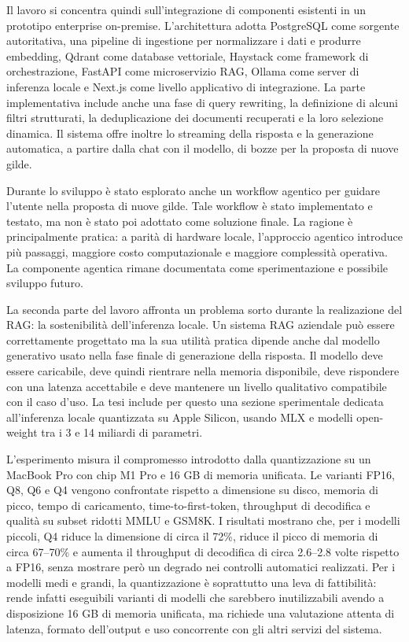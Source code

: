 Il lavoro si concentra quindi sull'integrazione di componenti esistenti in un prototipo enterprise on-premise. 
L'architettura adotta PostgreSQL come sorgente autoritativa, una pipeline di ingestione per normalizzare i dati 
e produrre embedding, Qdrant come database vettoriale, Haystack come framework di orchestrazione, FastAPI come 
microservizio RAG, Ollama come server di inferenza locale e Next.js come livello applicativo di integrazione. 
La parte implementativa include anche una fase di query rewriting, la definizione di alcuni filtri strutturati, 
la deduplicazione dei documenti recuperati e la loro selezione dinamica. Il sistema offre inoltre lo streaming 
della risposta e la generazione automatica, a partire dalla chat con il modello, di bozze per la proposta di nuove gilde.

Durante lo sviluppo è stato esplorato anche un workflow agentico per guidare
l'utente nella proposta di nuove gilde. Tale workflow è stato implementato e
testato, ma non è stato poi adottato come soluzione finale. La ragione è
principalmente pratica: a parità di hardware locale, l'approccio agentico introduce più
passaggi, maggiore costo computazionale e maggiore complessità operativa. La componente agentica rimane
documentata come sperimentazione e possibile sviluppo futuro.

La seconda parte del lavoro affronta un problema sorto durante la realizazione del RAG: la
sostenibilità dell'inferenza locale. Un sistema RAG aziendale può essere
correttamente progettato ma la sua utilità pratica dipende anche dal modello
generativo usato nella fase finale di generazione della risposta. Il modello deve essere
caricabile, deve quindi rientrare nella memoria disponibile, deve rispondere con una
latenza accettabile e deve mantenere un livello qualitativo compatibile con il
caso d'uso. La tesi include per questo una sezione sperimentale dedicata
all'inferenza locale quantizzata su Apple Silicon, usando MLX e modelli
open-weight tra i 3 e 14 miliardi di parametri.

L'esperimento misura il compromesso introdotto dalla quantizzazione su un
MacBook Pro con chip M1 Pro e 16 GB di memoria unificata. Le varianti FP16,
Q8, Q6 e Q4 vengono confrontate rispetto a dimensione su disco, memoria di
picco, tempo di caricamento, time-to-first-token, throughput di decodifica e
qualità su subset ridotti MMLU e GSM8K. I risultati mostrano che, per i
modelli piccoli, Q4 riduce la dimensione di circa il 72\%, riduce il picco di
memoria di circa 67--70\% e aumenta il throughput di decodifica di circa
2.6--2.8 volte rispetto a FP16, senza mostrare però un degrado nei
controlli automatici realizzati. Per i modelli medi e grandi, la quantizzazione è
soprattutto una leva di fattibilità: rende infatti eseguibili varianti di modelli che
sarebbero inutilizzabili avendo a disposizione 16 GB di memoria unificata, ma richiede una valutazione
attenta di latenza, formato dell'output e uso concorrente con gli altri servizi
del sistema.

